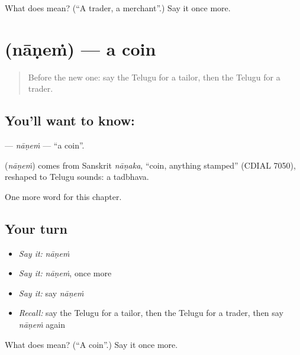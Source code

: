 \begin{tcolorbox}[breakable,colback=teal!4,colframe=teal!35!black,title={Before you move on}]
What does  mean? (\textquotedblleft{}A trader, a merchant\textquotedblright{}.) Say it once more.
\end{tcolorbox}
\section[\texorpdfstring{\te{నాణెం} (nāṇeṁ)}{నాణెం (nāṇeṁ)}]{ (nāṇeṁ) — a coin}

\label{lesson:TE-C194-nanem}



\begin{quote}
Before the new one: say the Telugu for a tailor, then the Telugu for a trader.
\end{quote}

\subsection*{You'll want to know: }
\textbf{} — \emph{nāṇeṁ} — \textquotedblleft{}a coin\textquotedblright{}.

\begin{cousinweb}
\textbf{} (\emph{nāṇeṁ}) comes from Sanskrit \emph{nāṇaka}, \textquotedblleft{}coin, anything stamped\textquotedblright{} (CDIAL 7050), reshaped to Telugu sounds: a tadbhava.
\end{cousinweb}

\begin{grammarlens}[title={What you've built}]
One more word for this chapter.
\end{grammarlens}

\subsection*{Your turn}
\begin{itemize}
\raggedright
  \item \emph{Say it:} \emph{nāṇeṁ}
  \item \emph{Say it:} \emph{nāṇeṁ}, once more
  \item \emph{Say it:} say \emph{nāṇeṁ}
  \item \emph{Recall:} say the Telugu for a tailor, then the Telugu for a trader, then say \emph{nāṇeṁ} again
\end{itemize}

\begin{tcolorbox}[breakable,colback=teal!4,colframe=teal!35!black,title={Before you move on}]
What does  mean? (\textquotedblleft{}A coin\textquotedblright{}.) Say it once more.
\end{tcolorbox}
